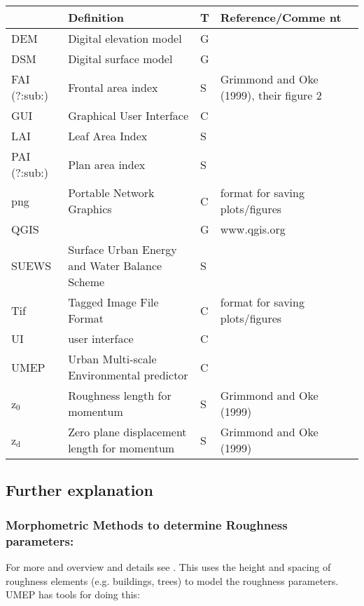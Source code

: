 \documentclass[letterpaper,10pt,english]{sphinxmanual}
\begin{document}
\begin{savenotes}\sphinxattablestart
\centering
\begin{tabulary}{\linewidth}[t]{|T|T|T|T|}
\hline
\sphinxstyletheadfamily &\sphinxstyletheadfamily 
Definition
&\sphinxstyletheadfamily 
T
&\sphinxstyletheadfamily 
Reference/Comme
nt
\\
\hline
DEM
&
Digital
elevation model
&
G
&\\
\hline
DSM
&
Digital surface
model
&
G
&\\
\hline
FAI (?:sub:)
&
Frontal area
index
&
S
&
Grimmond and
Oke (1999),
their figure 2
\\
\hline
GUI
&
Graphical User
Interface
&
C
&\\
\hline
LAI
&
Leaf Area Index
&
S
&\\
\hline
PAI (?:sub:)
&
Plan area index
&
S
&\\
\hline
png
&
Portable
Network
Graphics
&
C
&
format for
saving
plots/figures
\\
\hline
QGIS
&&
G
&
www.qgis.org
\\
\hline
SUEWS
&
Surface Urban
Energy and
Water Balance
Scheme
&
S
&\\
\hline
Tif
&
Tagged Image
File Format
&
C
&
format for
saving
plots/figures
\\
\hline
UI
&
user interface
&
C
&\\
\hline
UMEP
&
Urban
Multi-scale
Environmental
predictor
&
C
&\\
\hline
z$_{\text{0}}$
&
Roughness
length for
momentum
&
S
&
Grimmond and
Oke (1999)
\\
\hline
z$_{\text{d}}$
&
Zero plane
displacement
length for
momentum
&
S
&
Grimmond and
Oke (1999)
\\
\hline
\end{tabulary}
\par
\sphinxattableend\end{savenotes}


\subsection{Further explanation}
\label{\detokenize{Tutorials/SuewsAdvanced:further-explanation}}

\subsubsection{Morphometric Methods to determine Roughness parameters:}
\label{\detokenize{Tutorials/SuewsAdvanced:morphometric-methods-to-determine-roughness-parameters}}
For more and overview and details see .
This uses the height and spacing of roughness elements (e.g. buildings,
trees) to model the roughness parameters. UMEP has tools for doing this:
\end{document}
